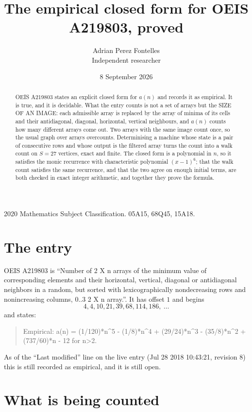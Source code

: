\documentclass[11pt,a4paper]{article}
\title{The empirical closed form for OEIS A219803, proved}
\author{Adrian Perez Fontelles\\ \small Independent researcher}
\date{8 September 2026}
\theoremstyle{plain}
\theoremstyle{definition}
\begin{document}
\maketitle

\begin{abstract}
OEIS A219803 states an explicit closed form for $a(n)$ and records it as empirical. It is true, and
it is decidable. What the entry counts is not a set of arrays but the SIZE OF AN IMAGE: each
admissible array is replaced by the array of minima of its cells and their antidiagonal, diagonal, horizontal, vertical neighbours,
and $a(n)$ counts how many different arrays come out. Two arrays with the same image count
once, so the usual graph over arrays overcounts. Determinising a machine whose state is a pair
of consecutive rows and whose output is the filtered array turns the count into a walk count on
$S=27$ vertices, exact and finite. The closed form is a polynomial in $n$, so it satisfies the
monic recurrence with characteristic polynomial $(x-1)^{6}$; that the walk count
satisfies the same recurrence, and that the two agree on enough initial terms, are both checked
in exact integer arithmetic, and together they prove the formula.
\end{abstract}

\noindent\small 2020 Mathematics Subject Classification. 05A15, 68Q45, 15A18.\normalsize

\section{The entry}

OEIS A219803 is ``Number of 2 X n arrays of the minimum value of corresponding elements and their horizontal, vertical, diagonal or antidiagonal neighbors in a random, but sorted with lexicographically nondecreasing rows and nonincreasing columns, 0..3 2 X n array.''. It has offset $1$ and begins
\[
4, 4, 10, 21, 39, 68, 114, 186,\ \dots
\]
and states:
\begin{quote}
Empirical: a(n) = (1/120)*n\^{}5 - (1/8)*n\^{}4 + (29/24)*n\^{}3 - (35/8)*n\^{}2 + (737/60)*n - 12 for n>2.
\end{quote}
As of the ``Last modified'' line on the live entry (Jul 28 2018 10:43:21, revision 8)
this is still recorded as empirical, and it is still open.

\section{What is being counted}
\end{document}
